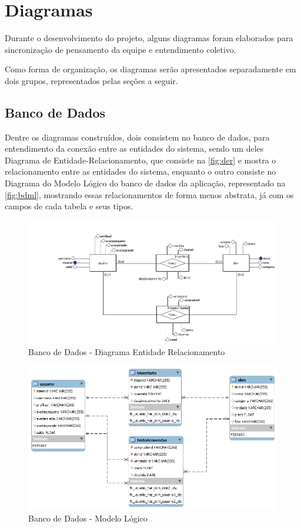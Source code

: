\chapter[Diagramas]{Diagramas}
Durante o desenvolvimento do projeto, alguns diagramas foram elaborados para sincronização de pensamento da equipe e entendimento coletivo.

Como forma de organização, os diagramas serão apresentados separadamente em dois grupos, representados pelas seções a seguir.

 \section{Banco de Dados}
  Dentre os diagramas construídos, dois consistem no banco de dados, para entendimento da conexão entre as entidades do sistema, sendo um deles Diagrama de Entidade-Relacionamento, que consiste na \autoref{fig:der} e mostra o relacionamento entre as entidades do sistema, enquanto o outro consiste no Diagrama do Modelo Lógico do banco de dados da aplicação, representado na \autoref{fig:bdml}, mostrando essas relacionamentos de forma menos abstrata, já com os campos de cada tabela e seus tipos.

  \begin{figure}[!htb]
        \centering
        \includegraphics[scale=0.5]{Imagens/Relacionamento.png}
        \caption{Banco de Dados - Diagrama Entidade Relacionamento}
        \label{fig:der}
 \end{figure}

\begin{figure}[!htb]
	\centering
	\includegraphics[scale=0.6]{Imagens/Logico.png}
	\caption{Banco de Dados - Modelo Lógico}
	\label{fig:bdml}
\end{figure}
\clearpage

